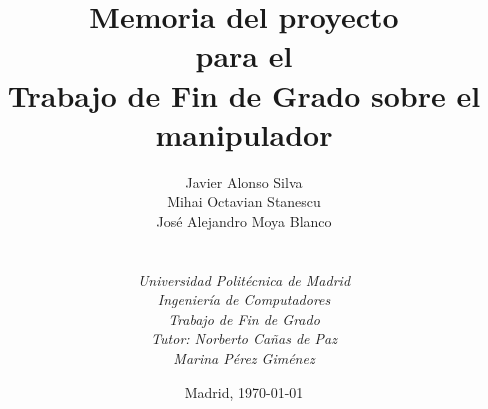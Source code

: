 
\def\Company{Consultancy}
\def\Institute{\textit{Universidad Politécnica de Madrid}}
\def\Course{\textit{Ingeniería de Computadores}}
\def\Module{\textit{Trabajo de Fin de Grado}}
\def\Docent{\textit{Tutor: Norberto Cañas de Paz} \\ \textit{Marina Pérez Giménez}}
\def\Assistant{}

\def\BoldTitle{Memoria del proyecto}

\def\Subtitle{para el \\ Trabajo de Fin de Grado sobre el manipulador \pArm{} \\}
\def\Authors{Javier Alonso Silva \\ Mihai Octavian Stanescu \\ José Alejandro Moya Blanco } 
\def\Shortname{J. Alonso, M. Stanescu, A. Moya}


\title{\textbf{\BoldTitle}\\\Subtitle}
\author{\Authors \\ \\ \\ \Institute\\ \Course\\ \Module\\ \Docent}
\date{Madrid, \today{}}

